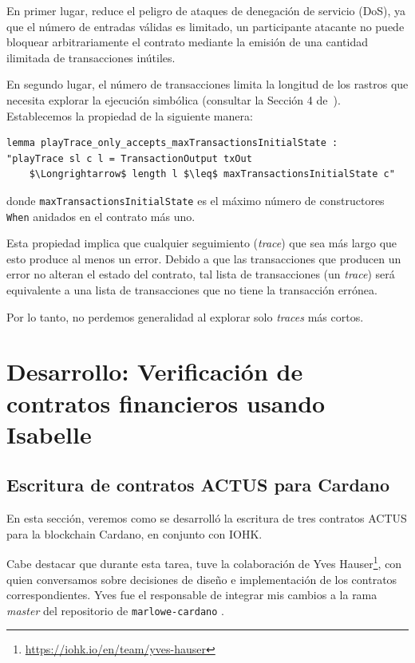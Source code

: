 \documentclass[12pt]{book}
\begin{document}
En primer lugar, reduce el peligro de ataques de denegación de servicio (DoS), ya que el número de entradas válidas es limitado, un participante atacante no puede bloquear arbitrariamente el contrato mediante la emisión de una cantidad ilimitada de transacciones inútiles.

En segundo lugar, el número de transacciones limita la longitud de los rastros que necesita explorar la ejecución simbólica (consultar la Sección 4 de~\cite{implementing_financial_contracts_on_blockchain}). Establecemos la propiedad de la siguiente manera:

\begin{lstlisting}[style=Isabelle]
lemma playTrace_only_accepts_maxTransactionsInitialState :
"playTrace sl c l = TransactionOutput txOut
    $\Longrightarrow$ length l $\leq$ maxTransactionsInitialState c"
\end{lstlisting}

donde \texttt{maxTransactionsInitialState} es el máximo número de constructores \texttt{When} anidados en el contrato más uno.

Esta propiedad implica que cualquier seguimiento (\textit{trace}) que sea más largo que esto produce al menos un error. Debido a que las transacciones que producen un error no alteran el estado del contrato, tal lista de transacciones (un \textit{trace}) será equivalente a una lista de transacciones que no tiene la transacción errónea.

Por lo tanto, no perdemos generalidad al explorar solo \textit{traces} más cortos.



\chapter[Verificación de contratos financieros en Isabelle]{Desarrollo: Verificación de contratos financieros usando Isabelle}
\section{Escritura de contratos ACTUS para Cardano}

En esta sección, veremos como se desarrolló la escritura de tres contratos ACTUS para la blockchain Cardano, en conjunto con IOHK.\@

Cabe destacar que durante esta tarea, tuve la colaboración de Yves Hauser\footnote{\url{https://iohk.io/en/team/yves-hauser}}, con quien conversamos sobre decisiones de diseño e implementación de los contratos correspondientes. Yves fue el responsable de integrar mis cambios a la rama \textit{master} del repositorio de \texttt{marlowe-cardano} \cite{marlowe-cardano-github}. %
\end{document}
